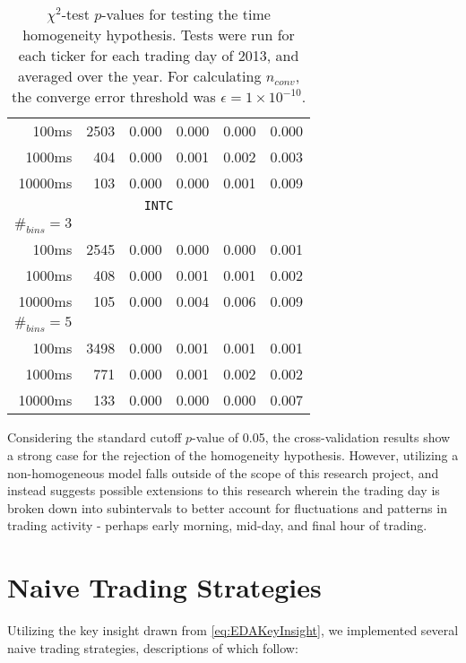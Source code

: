 \begin{table}[H]
\begin{tabular}{@{}rrrrrr@{}}
100ms &  2503 & 0.000 & 0.000 & 0.000 & 0.000 \\
1000ms &  404 & 0.000 & 0.001 & 0.002 & 0.003 \\
10000ms & 103 & 0.000 & 0.000 & 0.001 & 0.009 \\
\multicolumn{6}{c}{\texttt{INTC}} \\
$\#_{bins}=3$ &&&&& \\
100ms &  2545 & 0.000 & 0.000 & 0.000 & 0.001 \\
1000ms &  408 & 0.000 & 0.001 & 0.001 & 0.002 \\
10000ms & 105 & 0.000 & 0.004 & 0.006 & 0.009 \\
$\#_{bins}=5$ &&&&& \\
100ms &  3498 & 0.000 & 0.001 & 0.001 & 0.001 \\
1000ms &  771 & 0.000 & 0.001 & 0.002 & 0.002 \\
10000ms & 133 & 0.000 & 0.000 & 0.000 & 0.007 \\
\bottomrule
\end{tabular}
\caption{$\chi^2$-test $p$-values for testing the time homogeneity hypothesis. Tests were run for each ticker for each trading day of 2013, and averaged over the year. For calculating $n_{conv}$, the converge error threshold was $\epsilon = 1\times 10^{-10}$.}
\label{tbl:pvalues}
\end{table}
Considering the standard cutoff $p$-value of 0.05, the cross-validation results show a strong case for the rejection of the homogeneity hypothesis. However, utilizing a non-homogeneous model falls outside of the scope of this research project, and instead suggests possible extensions to this research wherein the trading day is broken down into subintervals to better account for fluctuations and patterns in trading activity - perhaps early morning, mid-day, and final hour of trading.

\section{Naive Trading Strategies}
Utilizing the key insight drawn from \eqref{eq:EDAKeyInsight}, we implemented several naive trading strategies, descriptions of which follow:

